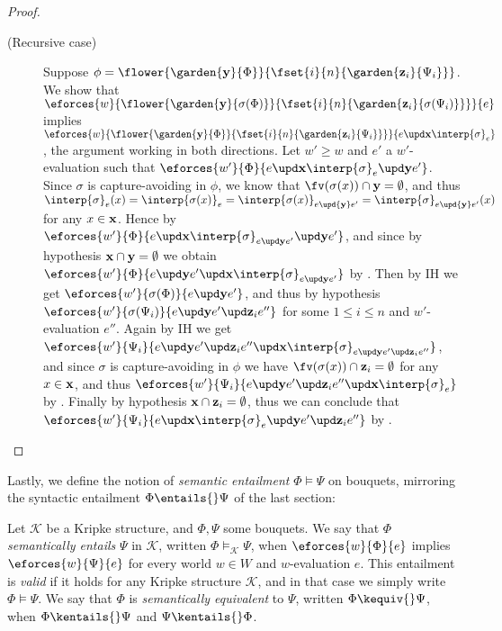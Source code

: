 \begin{scope}
\begin{proof}
\begin{description}
    \item[(Recursive case)]
    Suppose $\phi =
    \flower{\garden{\by}{\Phi}}{\fset{i}{n}{\garden{\bz_i}{\Psi_i}}}$. We show
    that
    $\eforces{w}{\flower{\garden{\by}{\sigma(\Phi)}}{\fset{i}{n}{\garden{\bz_i}{\sigma(\Psi_i)}}}}{e}$
    implies
    $\eforces{w}{\flower{\garden{\by}{\Phi}}{\fset{i}{n}{\garden{\bz_i}{\Psi_i}}}}{\update{e}{\bx}{\interp{\sigma}}_e}$,
    the argument working in both directions. Let $w' \geq w$ and $e'$ a
    $w'$-evaluation such that
    $\eforces{w'}{\Phi}{\update{e}{\bx}{\update{\interp{\sigma}_e}{\by}{e'}}}$.
    Since $\sigma$ is capture-avoiding in $\phi$, we know that $\fv(\sigma(x))
    \cap \by = \emptyset$, and thus $\interp{\sigma}_e(x) =
    \interp{\sigma(x)}_{e} = \interp{\sigma(x)}_{e \upd{\by} e'} =
    \interp{\sigma}_{e \upd{\by} e'}(x)$ for any $x \in \mathbf{x}$. Hence by
    $\eforces{w'}{\Phi}{\update{e}{\bx}{\update{\interp{\sigma}_{\update{e}{\by}{e'}}}{\by}{e'}}}$,
    and since by hypothesis $\mathbf{x} \cap \mathbf{y} = \emptyset$ we obtain
    $\eforces{w'}{\Phi}{\update{e}{\by}{\update{e'}{\bx}{\interp{\sigma}_{\update{e}{\by}{e'}}}}}$
    by . Then by IH we get
    $\eforces{w'}{\sigma(\Phi)}{\update{e}{\by}{e'}}$, and thus by hypothesis
    $\eforces{w'}{\sigma(\Psi_i)}{\update{e}{\by}{\update{e'}{\bz_i}{e''}}}$ for
    some $1 \leq i \leq n$ and $w'$-evaluation $e''$. Again by IH we get
    $\eforces{w'}{\Psi_i}{\update{e}{\by}{\update{e'}{\bz_i}{\update{e''}{\bx}{\interp{\sigma}_{\update{e}{\by}{\update{e'}{\bz_i}{e''}}}}}}}$,
    and since $\sigma$ is capture-avoiding in $\phi$ we have $\fv(\sigma(x))
    \cap \bz_i = \emptyset$ for any $x \in \mathbf{x}$, and thus
    $\eforces{w'}{\Psi_i}{\update{e}{\by}{\update{e'}{\bz_i}{\update{e''}{\bx}{\interp{\sigma}_{e}}}}}$
    by . Finally by hypothesis $\mathbf{x} \cap \mathbf{z}_i =
    \emptyset$, thus we can conclude that
    $\eforces{w'}{\Psi_i}{\update{e}{\bx}{\update{\interp{\sigma}_{e}}{\by}{\update{e'}{\bz_i}{e''}}}}$
    by .
  \end{description}
\end{proof}

Lastly, we define the notion of \emph{semantic entailment} $\Phi \vDash \Psi$ on
bouquets, mirroring the syntactic entailment $\Phi \entails{} \Psi$ of the last
section:

\begin{definition}
  Let $\mathcal{K}$ be a Kripke structure, and $\Phi, \Psi$ some bouquets. We
  say that $\Phi$ \emph{semantically entails} $\Psi$ in $\mathcal{K}$, written
  $\Phi \vDash_{\mathcal{K}} \Psi$, when $\eforces{w}{\Phi}{e}$ implies
  $\eforces{w}{\Psi}{e}$ for every world $w \in W$ and $w$-evaluation $e$. This
  entailment is \emph{valid} if it holds for any Kripke structure $\mathcal{K}$,
  and in that case we simply write $\Phi \vDash \Psi$. We say that $\Phi$ is
  \emph{semantically equivalent} to $\Psi$, written $\Phi \kequiv{} \Psi$, when
  $\Phi \kentails{}\Psi$ and $\Psi \kentails{}\Phi$.
\end{definition}


\end{scope}
